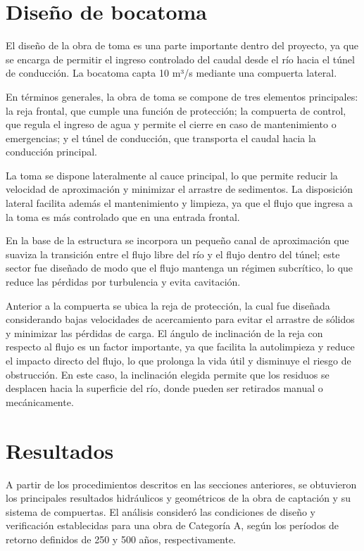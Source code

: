 \documentclass{article} %
\begin{document}
\section{Diseño de bocatoma}

El diseño de la obra de toma es una parte importante dentro del proyecto, ya que se encarga de permitir el ingreso controlado del caudal desde el río hacia el túnel de conducción. La bocatoma capta 10 m³/s mediante una compuerta lateral.

En términos generales, la obra de toma se compone de tres elementos principales: la reja frontal, que cumple una función de protección; la compuerta de control, que regula el ingreso de agua y permite el cierre en caso de mantenimiento o emergencias; y el túnel de conducción, que transporta el caudal hacia la conducción principal.

La toma se dispone lateralmente al cauce principal, lo que permite reducir la velocidad de aproximación y minimizar el arrastre de sedimentos. La disposición lateral facilita además el mantenimiento y limpieza, ya que el flujo que ingresa a la toma es más controlado que en una entrada frontal.

En la base de la estructura se incorpora un pequeño canal de aproximación que suaviza la transición entre el flujo libre del río y el flujo dentro del túnel; este sector fue diseñado de modo que el flujo mantenga un régimen subcrítico, lo que reduce las pérdidas por turbulencia y evita cavitación.

Anterior a la compuerta se ubica la reja de protección, la cual fue diseñada considerando bajas velocidades de acercamiento para evitar el arrastre de sólidos y minimizar las pérdidas de carga. El ángulo de inclinación de la reja con respecto al flujo es un factor importante, ya que facilita la autolimpieza y reduce el impacto directo del flujo, lo que prolonga la vida útil y disminuye el riesgo de obstrucción. En este caso, la inclinación elegida permite que los residuos se desplacen hacia la superficie del río, donde pueden ser retirados manual o mecánicamente. 

\newpage
\section{Resultados}

A partir de los procedimientos descritos en las secciones anteriores, se obtuvieron los principales resultados hidráulicos y geométricos de la obra de captación y su sistema de compuertas. El análisis consideró las condiciones de diseño y verificación establecidas para una obra de Categoría A, según los períodos de retorno definidos de 250 y 500 años, respectivamente.
\end{document}

